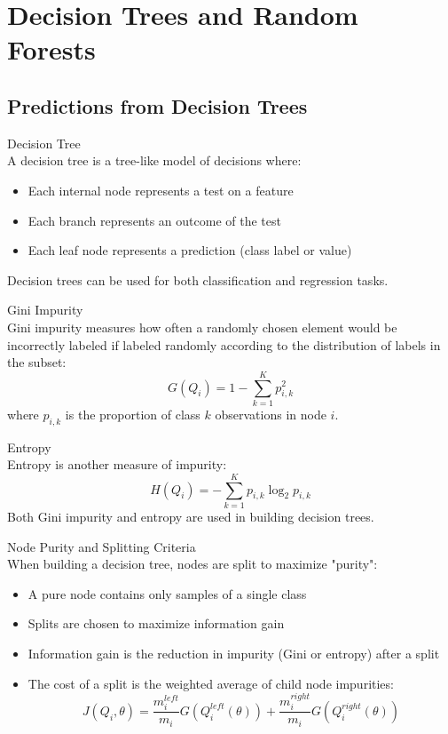\section{Decision Trees and Random Forests}

\subsection{Predictions from Decision Trees}

\begin{definition}{Decision Tree}\\
A decision tree is a tree-like model of decisions where:
\begin{itemize}
    \item Each internal node represents a test on a feature
    \item Each branch represents an outcome of the test
    \item Each leaf node represents a prediction (class label or value)
\end{itemize}
Decision trees can be used for both classification and regression tasks.
\end{definition}

\begin{definition}{Gini Impurity}\\
Gini impurity measures how often a randomly chosen element would be incorrectly labeled if labeled randomly according to the distribution of labels in the subset:
\[G(Q_i) = 1 - \sum_{k=1}^{K} p_{i,k}^2\]
where $p_{i,k}$ is the proportion of class $k$ observations in node $i$.
\end{definition}

\begin{definition}{Entropy}\\
Entropy is another measure of impurity:
\[H(Q_i) = -\sum_{k=1}^{K} p_{i,k} \log_2 p_{i,k}\]
Both Gini impurity and entropy are used in building decision trees.
\end{definition}

\begin{concept}{Node Purity and Splitting Criteria}\\
When building a decision tree, nodes are split to maximize "purity":
\begin{itemize}
    \item A pure node contains only samples of a single class
    \item Splits are chosen to maximize information gain
    \item Information gain is the reduction in impurity (Gini or entropy) after a split
    \item The cost of a split is the weighted average of child node impurities:
    \[J(Q_i, \theta) = \frac{m^{left}_i}{m_i}G(Q^{left}_i(\theta)) + \frac{m^{right}_i}{m_i}G(Q^{right}_i(\theta))\]
\end{itemize}
\end{concept}

